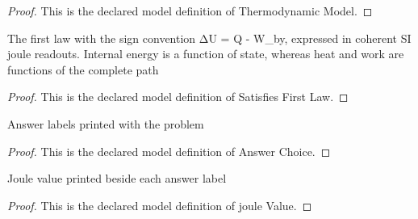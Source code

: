 \begin{proof}
  This is the declared model definition of Thermodynamic Model.
\end{proof}
\begin{definition}
  \label{def:physics:phyx-mini-0340:phyxminiproblems-problemphyxmini0340-satisfiesfirstlaw}
  The first law with the sign convention ΔU = Q - W\_by, expressed in coherent SI joule readouts. Internal energy is a function of state, whereas heat and work are functions of the complete path
\end{definition}
\begin{proof}
  This is the declared model definition of Satisfies First Law.
\end{proof}
\begin{definition}
  \label{def:physics:phyx-mini-0340:phyxminiproblems-problemphyxmini0340-answerchoice}
  Answer labels printed with the problem
\end{definition}
\begin{proof}
  This is the declared model definition of Answer Choice.
\end{proof}
\begin{definition}
  \label{def:physics:phyx-mini-0340:phyxminiproblems-problemphyxmini0340-answerchoice-joulevalue}
  Joule value printed beside each answer label
\end{definition}
\begin{proof}
  This is the declared model definition of joule Value.
\end{proof}
